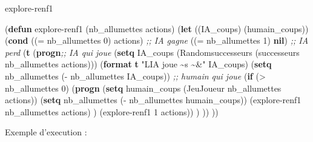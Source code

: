 \documentclass[
]{article}
\newenvironment{Shaded}{}{}
\newcommand{\CommentTok}[1]{\textcolor[rgb]{0.38,0.63,0.69}{\textit{#1}}}
\newcommand{\DecValTok}[1]{\textcolor[rgb]{0.25,0.63,0.44}{#1}}
\newcommand{\FunctionTok}[1]{\textcolor[rgb]{0.02,0.16,0.49}{#1}}
\newcommand{\KeywordTok}[1]{\textcolor[rgb]{0.00,0.44,0.13}{\textbf{#1}}}
\newcommand{\NormalTok}[1]{#1}
\newcommand{\OperatorTok}[1]{\textcolor[rgb]{0.40,0.40,0.40}{#1}}
\newcommand{\StringTok}[1]{\textcolor[rgb]{0.25,0.44,0.63}{#1}}
\begin{document}
\begin{Shaded}    
    \begin{algorithm}[H]
        \caption{explore-renf1}
\begin{Highlighting}[]

\NormalTok{(}\KeywordTok{defun}\FunctionTok{ explore{-}renf1 }\NormalTok{(nb\_allumettes actions)}
\NormalTok{  (}\KeywordTok{let}\NormalTok{ ((IA\_coups) (humain\_coups))}
\NormalTok{    (}\KeywordTok{cond} 
\NormalTok{     ((}\OperatorTok{=}\NormalTok{ nb\_allumettes }\DecValTok{0}\NormalTok{) actions) }\CommentTok{;; IA gagne}
\NormalTok{     ((}\OperatorTok{=}\NormalTok{ nb\_allumettes }\DecValTok{1}\NormalTok{) }\KeywordTok{nil}\NormalTok{) }\CommentTok{;; IA perd}
\NormalTok{     (}\KeywordTok{t} \NormalTok{(}\KeywordTok{progn}\CommentTok{;; IA qui joue}
\NormalTok{            (}\KeywordTok{setq}\NormalTok{ IA\_coups (Randomsuccesseurs (successeurs nb\_allumettes actions)))}
\NormalTok{        (}\KeywordTok{format} \KeywordTok{t} \StringTok{"L\textquotesingle{}IA joue \textasciitilde{}s \textasciitilde{}\&"}\NormalTok{ IA\_coups)}
\NormalTok{            (}\KeywordTok{setq}\NormalTok{ nb\_allumettes (}\OperatorTok{{-}}\NormalTok{ nb\_allumettes IA\_coups))}
        \CommentTok{;; humain qui joue}
\NormalTok{        (}\KeywordTok{if}\NormalTok{ (}\OperatorTok{\textgreater{}}\NormalTok{ nb\_allumettes }\DecValTok{0}\NormalTok{)}
\NormalTok{            (}\KeywordTok{progn}
\NormalTok{            (}\KeywordTok{setq}\NormalTok{ humain\_coups (JeuJoueur nb\_allumettes actions))}
\NormalTok{              (}\KeywordTok{setq}\NormalTok{ nb\_allumettes (}\OperatorTok{{-}}\NormalTok{ nb\_allumettes humain\_coups))}
\NormalTok{            (explore{-}renf1 nb\_allumettes actions)}
\NormalTok{              )}
\NormalTok{          (explore{-}renf1 }\DecValTok{1}\NormalTok{ actions))}
\NormalTok{            )}
\NormalTok{        ))}
\NormalTok{    ))}
\end{Highlighting}
    \end{algorithm}
\end{Shaded}

Exemple d'execution :
\end{document}
